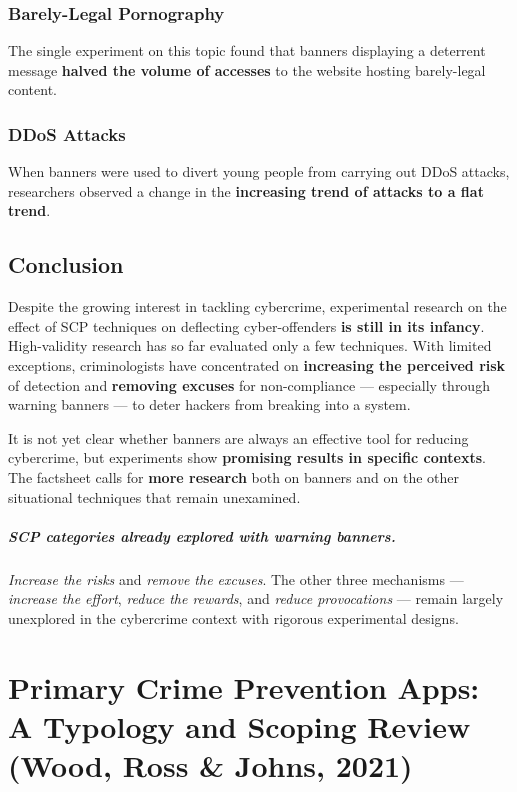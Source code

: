 \documentclass[11pt,a4paper,openany]{report}
\theoremstyle{definition}
\theoremstyle{plain}
\theoremstyle{remark}
\begin{document}
\subsection{Barely-Legal Pornography}

The single experiment on this topic found that banners displaying a deterrent message \textbf{halved the volume of accesses} to the website hosting barely-legal content.

\subsection{DDoS Attacks}

When banners were used to divert young people from carrying out DDoS attacks, researchers observed a change in the \textbf{increasing trend of attacks to a flat trend}.

\section{Conclusion}

Despite the growing interest in tackling cybercrime, experimental research on the effect of SCP techniques on deflecting cyber-offenders \textbf{is still in its infancy}. High-validity research has so far evaluated only a few techniques. With limited exceptions, criminologists have concentrated on \textbf{increasing the perceived risk} of detection and \textbf{removing excuses} for non-compliance --- especially through warning banners --- to deter hackers from breaking into a system.

It is not yet clear whether banners are always an effective tool for reducing cybercrime, but experiments show \textbf{promising results in specific contexts}. The factsheet calls for \textbf{more research} both on banners and on the other situational techniques that remain unexamined.

\paragraph{SCP categories already explored with warning banners.} \textit{Increase the risks} and \textit{remove the excuses}. The other three mechanisms --- \textit{increase the effort}, \textit{reduce the rewards}, and \textit{reduce provocations} --- remain largely unexplored in the cybercrime context with rigorous experimental designs.


\chapter{Primary Crime Prevention Apps: A Typology and Scoping Review (Wood, Ross \& Johns, 2021)}
\label{chap:pcp-apps}
\end{document}
